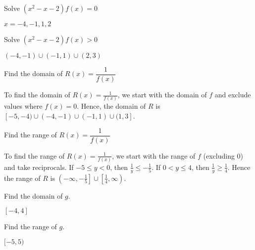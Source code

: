 \documentclass{ximera}
\begin{document}
\begin{question}
Solve $(x^2-x-2)f(x) = 0$
\begin{solution}
$x=-4, -1,1,2$
\end{solution}

\end{question}

\begin{question}
Solve  $(x^2-x-2)f(x) > 0$

\begin{solution}
$(-4,-1) \cup (-1,1) \cup (2,3)$ 

\end{solution}

\end{question}

\begin{question}
Find the domain of $R(x) = \dfrac{1}{f(x)}$
\begin{solution}
To find the domain of $R(x) = \frac{1}{f(x)}$, we start with the domain of $f$ and exclude values where $f(x) = 0$.  Hence, the domain of $R$ is $[-5,-4) \cup (-4,-1) \cup (-1,1) \cup (1,3]$.
\end{solution}

\end{question}

\begin{question}
Find the range of $R(x) = \dfrac{1}{f(x)}$

\begin{solution}
To find the range of $R(x) = \frac{1}{f(x)}$, we start with the range of $f$ (excluding $0$)  and take reciprocals.  If $-5 \leq y < 0$, then $\frac{1}{y} \leq -\frac{1}{5}$.  If $0 < y \leq 4$, then $\frac{1}{y} \geq \frac{1}{4}$. Hence the range of $R$ is $\left(-\infty, -\frac{1}{5} \right] \cup \left[ \frac{1}{4}, \infty \right)$. 

\end{solution}

\end{question}

\begin{question}
Find the domain of $g$.
\begin{solution}
$[-4,4]$
\end{solution}

\end{question}

\begin{question}
Find the range of $g$.

\begin{solution}
$[-5,5)$
\end{solution}

\end{question}
\end{document}
